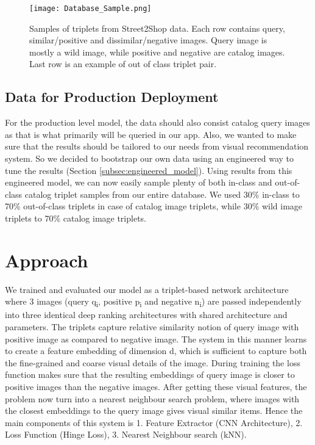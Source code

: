 \documentclass[10pt,twocolumn,letterpaper]{article}
\begin{document}
\begin{figure}[htp]
\centering
\texttt{[image: Database\_Sample.png]}
\caption{Samples of triplets from Street2Shop data. Each row contains query, similar/positive and dissimilar/negative images. Query image is mostly a wild image, while positive and negative are catalog images. Last row is an example of out of class triplet pair.}
\label{fig:database_sample}
\end{figure}

\subsection{Data for Production Deployment}
\label{subsec:data_production}
For the production level model, the data should also consist catalog query images as that is what primarily will be queried in our app. Also, we wanted to make sure that the results should be tailored to our needs from visual recommendation system. So we decided to bootstrap our own data using an engineered way to tune the results (Section \ref{subsec:engineered_model}). Using results from this engineered model, we can now easily sample plenty of both in-class and out-of-class catalog triplet samples from our entire database. We used 30\% in-class to 70\% out-of-class triplets in case of catalog image triplets, while 30\% wild image triplets to 70\% catalog image triplets.

\vspace{-2mm}
\section{Approach}\vspace{-1mm}
\label{sec:approach}
We trained and evaluated our model as a triplet-based network architecture where 3 images (query q\textsubscript{i}, positive p\textsubscript{i} and negative n\textsubscript{i}) are passed independently into three identical deep ranking architectures with shared architecture and parameters. The triplets capture relative similarity notion of query image with positive image as compared to negative image. The system in this manner learns to create a feature embedding of dimension d, which is sufficient to capture both the fine-grained and coarse visual details of the image. During training the loss function makes sure that the resulting embeddings of query image is closer to positive images than the negative images. After getting these visual features, the problem now turn into a nearest neighbour search problem, where images with the closest embeddings to the query image gives visual similar items.
Hence the main components of this system is 1. Feature Extractor (CNN Architecture), 2. Loss Function (Hinge Loss), 3. Nearest Neighbour search (kNN).
\end{document}
